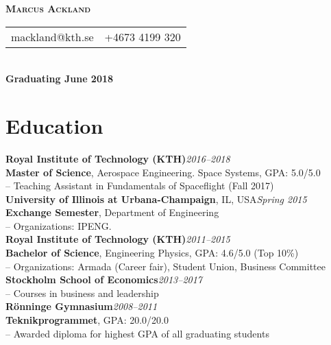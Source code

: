 \documentclass[10pt]{article}
\begin{document}

\centerline{\LARGE \textbf{\textsc{Marcus Ackland}}}

\begin{center}
  \begin{tabular}{l r}
    mackland@kth.se&+4673 4199 320
  \end{tabular} \\
  \vspace{0.1em}
  \textbf{Graduating June 2018}
\end{center}

\section*{Education}
\vspace{0.2em}
\hline
\vspace{0.5em}
\noindent\textbf{Royal Institute of Technology (KTH)}\hfill\textit{2016--2018}\\
\indent \textbf{Master of Science}, Aerospace Engineering. Space Systems, GPA: 5.0/5.0\\
\indent-- Teaching Assistant in Fundamentals of Spaceflight (Fall 2017)\\

\noindent\textbf{University of Illinois at Urbana-Champaign}, IL, USA\hfill\textit{Spring 2015}\\
\indent \textbf{Exchange Semester}, Department of Engineering\\
\indent-- Organizations: IPENG.\\

\noindent\textbf{Royal Institute of Technology (KTH)}\hfill\textit{2011--2015}\\
\indent \textbf{Bachelor of Science}, Engineering Physics, GPA: 4.6/5.0 (Top 10\%)\\
\indent-- Organizations: Armada (Career fair), Student Union, Business Committee\\

\noindent\textbf{Stockholm School of Economics}\hfill\textit{2013--2017}\\
\indent-- Courses in business and leadership\\

\noindent\textbf{Rönninge Gymnasium}\hfill\textit{2008--2011}\\
\indent\textbf{Teknikprogrammet}, GPA: 20.0/20.0\\
\indent-- Awarded diploma for highest GPA of all graduating students\\
\end{document}
